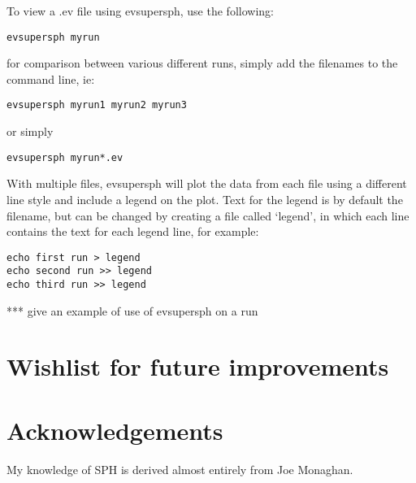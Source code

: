 \documentclass[a4paper,12pt]{article}
\begin{document}
To view a .ev file using evsupersph, use the following:
\begin{verbatim}
evsupersph myrun
\end{verbatim}
for comparison between various different runs, simply add the filenames to the
command line, ie:
\begin{verbatim}
evsupersph myrun1 myrun2 myrun3
\end{verbatim}
or simply
\begin{verbatim}
evsupersph myrun*.ev
\end{verbatim}
With multiple files, evsupersph will plot the data from each file using a
different line style and include a legend on the plot. Text for the legend is by
default the filename, but can be changed by creating a file called `legend', in
which each line contains the text for each legend line, for example:
\begin{verbatim}
echo first run > legend
echo second run >> legend
echo third run >> legend
\end{verbatim}
*** give an example of use of evsupersph on a run

\section{Wishlist for future improvements}

\section*{Acknowledgements}
 My knowledge of SPH is derived almost entirely from Joe Monaghan.



\end{document}
